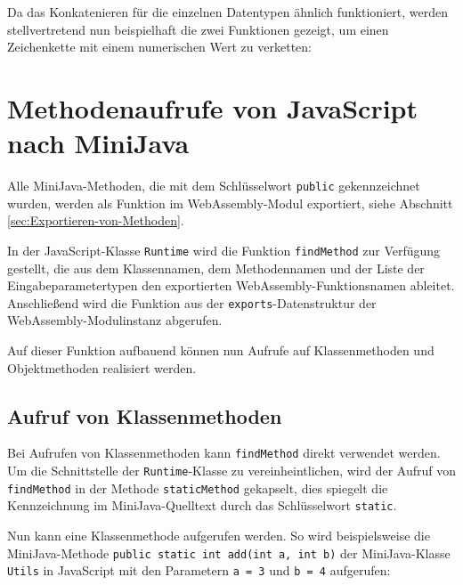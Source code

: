 Da das Konkatenieren für die einzelnen Datentypen ähnlich funktioniert, werden stellvertretend nun beispielhaft die zwei Funktionen gezeigt, um einen Zeichenkette mit einem numerischen Wert zu verketten:


\section{Methodenaufrufe von JavaScript nach MiniJava}

Alle MiniJava-Methoden, die mit dem Schlüsselwort \lstinline{public} gekennzeichnet wurden, werden als Funktion im WebAssembly-Modul exportiert, siehe Abschnitt \ref{sec:Exportieren-von-Methoden}.

In der JavaScript-Klasse \lstinline{Runtime} wird die Funktion \lstinline{findMethod} zur Verfügung gestellt, die aus dem Klassennamen, dem Methodennamen und der Liste der Eingabeparametertypen den exportierten WebAssembly-Funktionsnamen ableitet. Anschließend wird die Funktion aus der \lstinline{exports}-Datenstruktur der WebAssembly-Modulinstanz abgerufen.

\pagebreak


Auf dieser Funktion aufbauend können nun Aufrufe auf Klassenmethoden und Objektmethoden realisiert werden.

\subsection{Aufruf von Klassenmethoden}

Bei Aufrufen von Klassenmethoden kann \lstinline{findMethod} direkt verwendet werden. Um die Schnittstelle der \lstinline{Runtime}-Klasse zu vereinheintlichen, wird der Aufruf von \lstinline{findMethod} in der Methode \lstinline{staticMethod} gekapselt, dies spiegelt die Kennzeichnung im MiniJava-Quelltext durch das Schlüsselwort \lstinline{static}.



Nun kann eine Klassenmethode aufgerufen werden. So wird beispielsweise die Mini\-Java-Methode \lstinline{public static int add(int a, int b)} der MiniJava-Klasse \lstinline{Utils} in Java\-Script mit den Parametern \lstinline{a = 3} und \lstinline{b = 4} aufgerufen:



